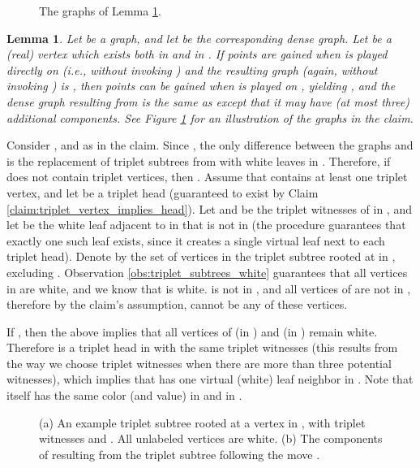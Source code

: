 \documentclass[11pt]{article}
\def\Proof{\par\noindent{\bf Proof:~}}
\newtheorem{lemma}[theorem]{Lemma}
\theoremstyle{definition}
\begin{document}
\begin{figure}[thbp]
  \caption{\sf The graphs of Lemma \ref{claim:ana_dense}.}
  \medskip
  \centering
  \label{fig:dense_graph_claim}
\end{figure}

\begin{lemma}
\label{claim:ana_dense}
Let  be a graph, and let  be the corresponding dense graph.
Let  be a (real) vertex which exists both in  and in .
If  points are gained when  is played directly on  (i.e., without invoking ) and the resulting graph (again, without invoking ) is , 
then  points can be gained when  is played on , yielding , and the dense graph  resulting from  is the same as  except that it may have (at most three) additional  components.
See Figure \ref{fig:dense_graph_claim} for an illustration of the graphs in the claim.
\end{lemma}
\Proof
Consider ,  and  as in the claim. 
Since , the only difference between the graphs  and  is the replacement of triplet subtrees from  with white leaves in .
Therefore, if  does not contain triplet vertices, then .
Assume that  contains at least one triplet vertex, and let  be a triplet head (guaranteed to exist by Claim \ref{claim:triplet_vertex_implies_head}).
Let  and  be the triplet witnesses of  in , and let  be the white leaf adjacent to  in  that is not in  
(the procedure  guarantees that exactly one such leaf exists, since it creates a single virtual leaf next to each triplet head).
Denote by  the set of vertices in the triplet subtree rooted at  in , excluding .
Observation \ref{obs:triplet_subtrees_white} guarantees that all vertices in  are white, and we know that  is white.
 is not in , and all vertices of  are not in , therefore by the claim's assumption,  cannot be any of these vertices.

If , then the above implies that all vertices of  (in ) and  (in ) remain white. Therefore  is a triplet head in  with the same triplet witnesses (this results from the way we choose triplet witnesses when there are more than three potential witnesses), which implies that  has one virtual (white) leaf neighbor in .
Note that  itself has the same color (and value) in  and in .

\begin{figure}[thbp]
  \caption{\sf (a) An example triplet subtree rooted at a vertex  in , with triplet witnesses  and . All unlabeled vertices are white.
		(b) The components of  resulting from the triplet subtree following the move .}
  \medskip
  \centering
  \label{fig:triplet_subtree_move}
\end{figure}
\end{document}
